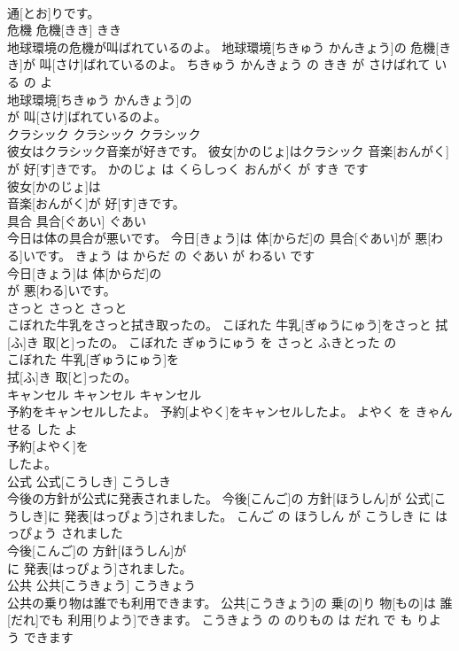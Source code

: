 \documentclass[8pt]{extreport}
\begin{document}
\begin{CJK}{UTF8}{min}
\\	通[とお]りです。			
\\	危機	危機[きき]	きき	
\\	地球環境の危機が叫ばれているのよ。	地球環境[ちきゅう かんきょう]の 危機[きき]が 叫[さけ]ばれているのよ。	ちきゅう かんきょう の きき が さけばれて いる の よ	
\\	地球環境[ちきゅう かんきょう]の
\\	が 叫[さけ]ばれているのよ。			
\\	クラシック	クラシック	クラシック	
\\	彼女はクラシック音楽が好きです。	彼女[かのじょ]はクラシック 音楽[おんがく]が 好[す]きです。	かのじょ は くらしっく おんがく が すき です	
\\	彼女[かのじょ]は
\\	音楽[おんがく]が 好[す]きです。			
\\	具合	具合[ぐあい]	ぐあい	
\\	今日は体の具合が悪いです。	今日[きょう]は 体[からだ]の 具合[ぐあい]が 悪[わる]いです。	きょう は からだ の ぐあい が わるい です	
\\	今日[きょう]は 体[からだ]の
\\	が 悪[わる]いです。			
\\	さっと	さっと	さっと	
\\	こぼれた牛乳をさっと拭き取ったの。	こぼれた 牛乳[ぎゅうにゅう]をさっと 拭[ふ]き 取[と]ったの。	こぼれた ぎゅうにゅう を さっと ふきとった の	
\\	こぼれた 牛乳[ぎゅうにゅう]を
\\	拭[ふ]き 取[と]ったの。			
\\	キャンセル	キャンセル	キャンセル	
\\	予約をキャンセルしたよ。	予約[よやく]をキャンセルしたよ。	よやく を きゃんせる した よ	
\\	予約[よやく]を
\\	したよ。			
\\	公式	公式[こうしき]	こうしき	
\\	今後の方針が公式に発表されました。	今後[こんご]の 方針[ほうしん]が 公式[こうしき]に 発表[はっぴょう]されました。	こんご の ほうしん が こうしき に はっぴょう されました	
\\	今後[こんご]の 方針[ほうしん]が
\\	に 発表[はっぴょう]されました。			
\\	公共	公共[こうきょう]	こうきょう	
\\	公共の乗り物は誰でも利用できます。	公共[こうきょう]の 乗[の]り 物[もの]は 誰[だれ]でも 利用[りよう]できます。	こうきょう の のりもの は だれ で も りよう できます	

\end{CJK}
\end{document}
